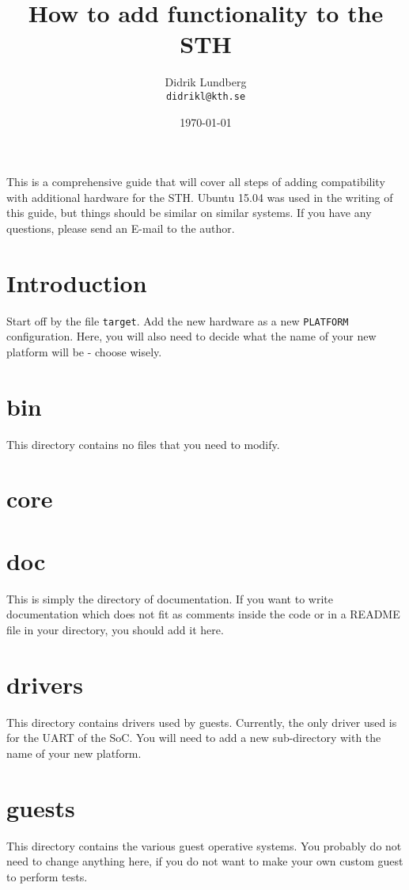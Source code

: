 \documentclass[a4paper,11pt,reqno]{amsart}
\title{How to add functionality to the STH}
\author{Didrik Lundberg\\
\texttt{didrikl@kth.se}}
\date{\today}
\begin{document}
\maketitle
\noindent
This is a comprehensive guide that will cover all steps of adding compatibility with additional hardware for the STH. Ubuntu 15.04 was used in the writing of this guide, but things should be similar on similar systems. If you have any questions, please send an E-mail to the author.
\section{Introduction}

Start off by the file \texttt{target}. Add the new hardware as a new \texttt{PLATFORM} configuration. Here, you will also need to decide what the name of your new platform will be - choose wisely.

\section{bin}

This directory contains no files that you need to modify.

\section{core}

\section{doc}

This is simply the directory of documentation. If you want to write documentation which does not fit as comments inside the code or in a README file in your directory, you should add it here.

\section{drivers}

This directory contains drivers used by guests. Currently, the only driver used is for the UART of the SoC. You will need to add a new sub-directory with the name of your new platform.

\section{guests}

This directory contains the various guest operative systems. You probably do not need to change anything here, if you do not want to make your own custom guest to perform tests.
\end{document}
